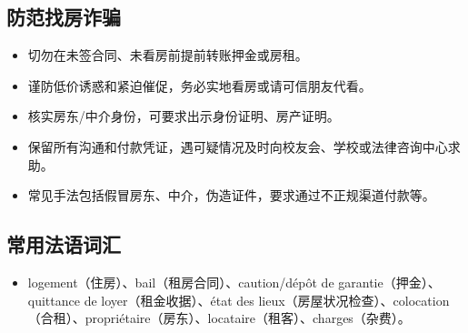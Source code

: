 \subsection{防范找房诈骗}
\begin{itemize}
    \item 切勿在未签合同、未看房前提前转账押金或房租。
    \item 谨防低价诱惑和紧迫催促，务必实地看房或请可信朋友代看。
    \item 核实房东/中介身份，可要求出示身份证明、房产证明。
    \item 保留所有沟通和付款凭证，遇可疑情况及时向校友会、学校或法律咨询中心求助。
    \item 常见手法包括假冒房东、中介，伪造证件，要求通过不正规渠道付款等。
\end{itemize}

\subsection{常用法语词汇}
\begin{itemize}
    \item logement（住房）、bail（租房合同）、caution/dépôt de garantie（押金）、quittance de loyer（租金收据）、état des lieux（房屋状况检查）、colocation（合租）、propriétaire（房东）、locataire（租客）、charges（杂费）。
\end{itemize}
